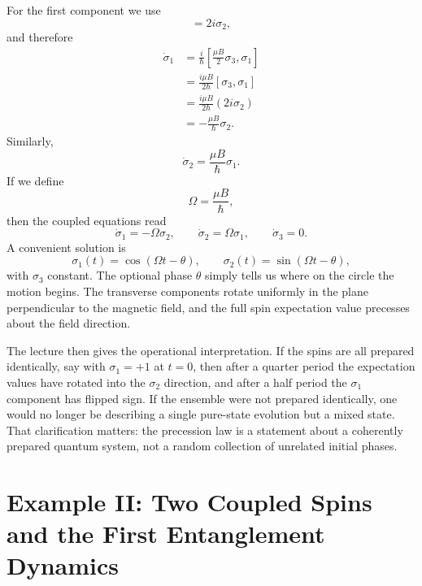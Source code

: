 For the first component we use
\begin{equation}
[\sigma_3,\sigma_1]=2i\sigma_2,
\end{equation}
and therefore
\begin{align}
\dot\sigma_1
&=
\frac{i}{\hbar}\left[\frac{\mu B}{2}\sigma_3,\sigma_1\right] \\
&=
\frac{i\mu B}{2\hbar}[\sigma_3,\sigma_1] \\
&=
\frac{i\mu B}{2\hbar}(2i\sigma_2) \\
&=
-\frac{\mu B}{\hbar}\sigma_2.
\end{align}
Similarly,
\begin{equation}
\dot\sigma_2=\frac{\mu B}{\hbar}\sigma_1.
\end{equation}
If we define
\begin{equation}
\Omega = \frac{\mu B}{\hbar},
\end{equation}
then the coupled equations read
\begin{equation}
\dot\sigma_1=-\Omega \sigma_2,
\qquad
\dot\sigma_2=\Omega \sigma_1,
\qquad
\dot\sigma_3=0.
\end{equation}
A convenient solution is
\begin{equation}
\sigma_1(t)=\cos(\Omega t-\theta),
\qquad
\sigma_2(t)=\sin(\Omega t-\theta),
\end{equation}
with \(\sigma_3\) constant. The optional phase \(\theta\) simply tells us where on the circle the motion begins. The transverse components rotate uniformly in the plane perpendicular to the magnetic field, and the full spin expectation value precesses about the field direction.

The lecture then gives the operational interpretation. If the spins are all prepared identically, say with \(\sigma_1=+1\) at \(t=0\), then after a quarter period the expectation values have rotated into the \(\sigma_2\) direction, and after a half period the \(\sigma_1\) component has flipped sign. If the ensemble were not prepared identically, one would no longer be describing a single pure-state evolution but a mixed state. That clarification matters: the precession law is a statement about a coherently prepared quantum system, not a random collection of unrelated initial phases.

\section{Example II: Two Coupled Spins and the First Entanglement Dynamics}

